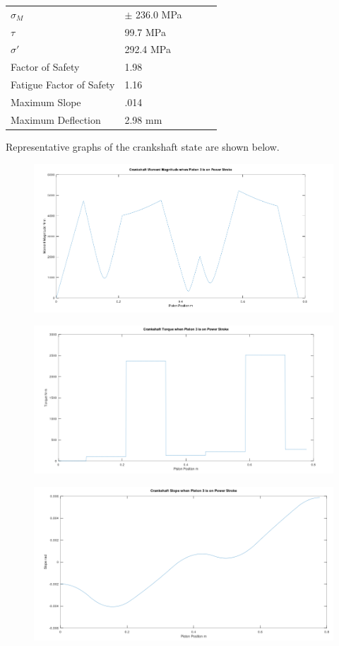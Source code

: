 \documentclass[10pt,a4paper]{article}
\begin{document}
\begin{table}[H]
\begin{tabular}{lllll}
 $\sigma_M$ & $\pm$ 236.0 MPa \\
 $\tau$ & 99.7 MPa \\
 $\sigma'$ & 292.4 MPa \\
 Factor of Safety & 1.98 \\
 Fatigue Factor of Safety &  1.16 \\
 Maximum Slope &  .014 \\
 Maximum Deflection & 2.98 mm
\end{tabular}
\end{table}

Representative graphs of the crankshaft state are shown below.
\begin{figure}[h]
		\centering
		\includegraphics[width=\textwidth]{csm.png}
	\end{figure}
	\begin{figure}[h]
		\centering
		\includegraphics[width=\textwidth]{cst.png}
	\end{figure}
	\begin{figure}[h]
		\centering
		\includegraphics[width=\textwidth]{css.png}
	\end{figure}
\end{document}
